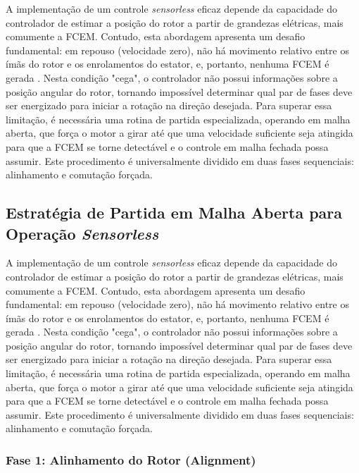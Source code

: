\documentclass[12pt, a4paper, openright, oneside, brazilian]{abntex2}
\begin{document}
A implementação de um controle \textit{sensorless} eficaz depende da capacidade do controlador de estimar a posição do rotor a partir de grandezas elétricas, mais comumente a FCEM. Contudo, esta abordagem apresenta um desafio fundamental: em repouso (velocidade zero), não há movimento relativo entre os ímãs do rotor e os enrolamentos do estator, e, portanto, nenhuma FCEM é gerada \cite{ti2013sensorless, nxp2023sensorless}. Nesta condição "cega", o controlador não possui informações sobre a posição angular do rotor, tornando impossível determinar qual par de fases deve ser energizado para iniciar a rotação na direção desejada. Para superar essa limitação, é necessária uma rotina de partida especializada, operando em malha aberta, que força o motor a girar até que uma velocidade suficiente seja atingida para que a FCEM se torne detectável e o controle em malha fechada possa assumir. Este procedimento é universalmente dividido em duas fases sequenciais: alinhamento e comutação forçada.

\subsection{Estratégia de Partida em Malha Aberta para Operação \textit{Sensorless}}

A implementação de um controle \textit{sensorless} eficaz depende da capacidade do controlador de estimar a posição do rotor a partir de grandezas elétricas, mais comumente a FCEM. Contudo, esta abordagem apresenta um desafio fundamental: em repouso (velocidade zero), não há movimento relativo entre os ímãs do rotor e os enrolamentos do estator, e, portanto, nenhuma FCEM é gerada \cite{ti2013sensorless, nxp2023sensorless}. Nesta condição "cega", o controlador não possui informações sobre a posição angular do rotor, tornando impossível determinar qual par de fases deve ser energizado para iniciar a rotação na direção desejada. Para superar essa limitação, é necessária uma rotina de partida especializada, operando em malha aberta, que força o motor a girar até que uma velocidade suficiente seja atingida para que a FCEM se torne detectável e o controle em malha fechada possa assumir. Este procedimento é universalmente dividido em duas fases sequenciais: alinhamento e comutação forçada.

\subsubsection{Fase 1: Alinhamento do Rotor (Alignment)}
\end{document}
